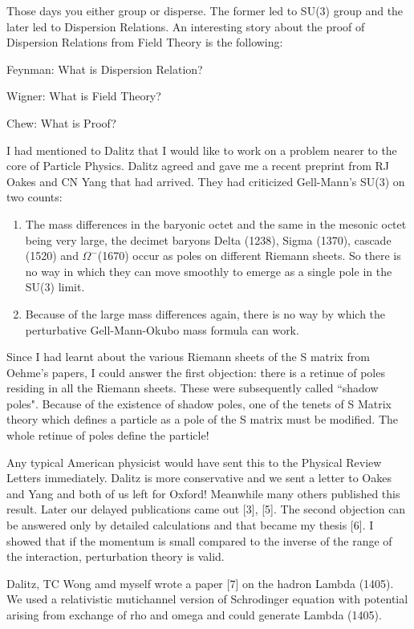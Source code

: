 Those days you either group or disperse. The former led to SU(3) group 
and the later led to Dispersion Relations. An intere\-sting story about 
the proof of Dispersion Relations from Field Theory is the following:

Feynman: What is Dispersion Relation?

Wigner: What is Field Theory?

Chew: What is Proof?

I had mentioned to Dalitz that I would like to work on a pro\-blem nearer 
to the core of Particle Physics. Dalitz agreed and gave me a recent 
preprint from RJ Oakes and CN Yang that had arrived. They had criticized 
Gell-Mann's SU(3) on two counts:

\begin{enumerate}
\itemsep=0pt
\item The mass differences in the baryonic octet and the same in the mesonic 
octet being very large, the decimet baryons Delta (1238), Sigma (1370), 
cascade (1520) and $\Omega^-$(1670) occur as poles on different Riemann 
sheets. So there is no way in which they can move smoothly to emerge as 
a single pole in the SU(3) limit.
\item Because of the large mass differences again, there is no way by which 
the perturbative Gell-Mann-Okubo mass formula can work.
\end{enumerate}

Since I had learnt about the various Riemann sheets of the S matrix from 
Oehme's papers, I could answer the first objection: there is a retinue 
of poles residing in all the Riemann sheets. These were subsequently 
called ``shadow poles". Because of the existence of shadow poles, one of 
the tenets of S Matrix theory which defines a particle as a pole of the 
S matrix must be modified. The whole retinue of poles define the 
particle!


\newpage

Any typical American physicist would have sent this to the Physical 
Review Letters immediately. Dalitz is more conservative and we sent a 
letter to Oakes and Yang and both of us left for Oxford! Meanwhile many 
others published this result. Later our delayed publications came out 
[3], [5]. The second objection can be answered only by detailed 
calculations and that became my thesis [6]. I showed that if the momentum 
is small compared to the inverse of the range of the interaction, 
perturbation theory is valid.

Dalitz, TC Wong amd myself wrote a paper [7] on the hadron Lambda 
(1405). We used a relativistic mutichannel version of Schrodinger 
equation with potential arising from exchange of rho and omega and could 
generate Lambda (1405).

